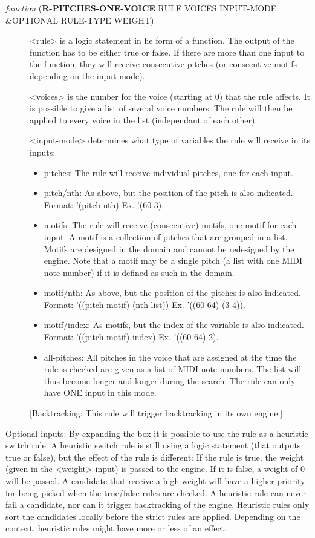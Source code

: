 \begin{description}
\item[{ \emph{function} (\textbf{R-PITCHES-ONE-VOICE} RULE VOICES INPUT-MODE \&OPTIONAL RULE-TYPE WEIGHT)}] <rule> is a logic statement in he form of a function. The output of the 
function has to be either true or false. If there are more than one 
input to the function, they will receive consecutive pitches (or 
consecutive motifs depending on the input-mode). 

<voices> is the number for the voice (starting at 0) that the rule affects. 
It is possible to give a list of several voice numbers: The rule will then 
be applied to every voice in the list (independant of each other).

<input-mode> determines what type of variables the rule will receive in 
its inputs:
\begin{itemize}
\item pitches: The rule will receive individual  pitches, one for each input.
\item pitch/nth: As above, but the position of the pitch is also indicated.
Format: '(pitch nth) Ex. '(60 3).
\item motifs: The rule will receive (consecutive) motifs, one motif for each 
input. A motif is a collection of pitches that are grouped in 
a list. Motifs are designed in the domain and cannot be redesigned
by the engine. Note that a motif may be a single pitch (a list 
with one MIDI note number) if it is defined as such in the domain.
\item motif/nth: As above, but the position of the pitches is also indicated.
Format: '((pitch-motif) (nth-list)) Ex. '((60 64) (3 4)).
\item motif/index: As motifs, but the index of the variable is also indicated.
Format: '((pitch-motif) index) Ex. '((60 64) 2).
\item all-pitches: All pitches in the voice that are assigned at the time the  
rule is checked are given as a list of MIDI note numbers.  
The list will thus become longer and longer during the 
search. The rule can only have ONE input in this mode.
\end{itemize}
[Backtracking: This rule will trigger backtracking in its own engine.]
\end{description}


Optional inputs:
By expanding the box it is possible to use the rule as a heuristic switch 
rule. A heuristic switch rule is still using a logic statement (that 
outputs true or false), but the effect of the rule is different: If the rule 
is true, the weight (given in the <weight> input) is passed to the engine. 
If it is false, a weight of 0 will be passed. A candidate that receive a 
high weight will have a higher priority for being picked when the true/false 
rules are checked. A heuristic rule can never fail a candidate, nor can it 
trigger backtracking of the engine. Heuristic rules only sort the 
candidates locally before the strict rules are applied. Depending on the 
context, heuristic rules might have more or less of an effect. 

